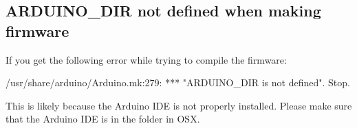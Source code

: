 \subsection{ARDUINO\_DIR not defined when making firmware}

\noindent If you get the following error while trying to compile the firmware:

\begin{snippet}
/usr/share/arduino/Arduino.mk:279: *** "ARDUINO_DIR is not defined". Stop.
\end{snippet}

\noindent This is likely because the Arduino IDE is not properly installed. Please make
sure that the Arduino IDE is in the  folder in OSX. 
